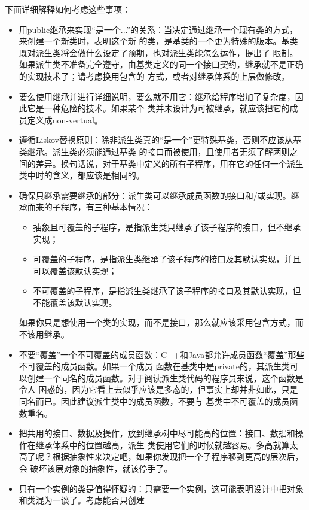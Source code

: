 \documentclass{article}
\begin{document}
下面详细解释如何考虑这些事项：
\begin{itemize}
    \item 用public继承来实现“是一个...”的关系：当决定通过继承一个现有类的方式，来创建一个新类时，表明这个新
    的类，是基类的一个更为特殊的版本。基类既对派生类将会做什么设定了预期，也对派生类能怎么运作，提出了
    限制。如果派生类不准备完全遵守，由基类定义的同一个接口契约，继承就不是正确的实现技术了；请考虑换用包含的
    方式，或者对继承体系的上层做修改。
    \item 要么使用继承并进行详细说明，要么就不用它：继承给程序增加了复杂度，因此它是一种危险的技术。如果某个
    类并未设计为可被继承，就应该把它的成员定义成non-vertual。
    \item 遵循Liskov替换原则：除非派生类真的“是一个”更特殊基类，否则不应该从基类继承。派生类必须能通过基类
    的接口而被使用，且使用者无须了解两则之间的差异。换句话说，对于基类中定义的所有子程序，用在它的任何一个派生
    类中时的含义，都应该是相同的。
    \item 确保只继承需要继承的部分：派生类可以继承成员函数的接口和/或实现。继承而来的子程序，有三种基本情况：
    \begin{itemize}
        \item 抽象且可覆盖的子程序，是指派生类只继承了该子程序的接口，但不继承实现；
        \item 可覆盖的子程序，是指派生类继承了该子程序的接口及其默认实现，并且可以覆盖该默认实现；
        \item 不可覆盖的子程序，是指派生类继承了该子程序的接口及其默认实现，但不能覆盖该默认实现。
    \end{itemize}
    如果你只是想使用一个类的实现，而不是接口，那么就应该采用包含方式，而不该用继承。
    \item 不要“覆盖”一个不可覆盖的成员函数：C++和Java都允许成员函数“覆盖”那些不可覆盖的成员函数。如果一个成员
    函数在基类中是private的，其派生类可以创建一个同名的成员函数。对于阅读派生类代码的程序员来说，这个函数是令人
    困惑的，因为它看上去似乎应该是多态的，但事实上却并非如此，只是同名而已。因此建议派生类中的成员函数，不要与
    基类中不可覆盖的成员函数重名。
    \item 把共用的接口、数据及操作，放到继承树中尽可能高的位置：接口、数据和操作在继承体系中的位置越高，派生
    类使用它们的时候就越容易。多高就算太高了呢？根据抽象性来决定吧，如果你发现把一个子程序移到更高的层次后，会
    破坏该层对象的抽象性，就该停手了。
    \item 只有一个实例的类是值得怀疑的：只需要一个实例，这可能表明设计中把对象和类混为一谈了。考虑能否只创建

\end{itemize}
\end{document}

